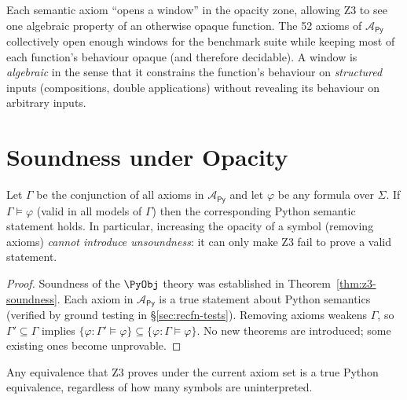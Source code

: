 \begin{remark}
\label{rem:axiom-windows}
Each semantic axiom ``opens a window'' in the opacity zone, allowing
Z3 to see one algebraic property of an otherwise opaque function.
The 52 axioms of $\mathcal{A}_{\mathsf{Py}}$ collectively open
enough windows for the benchmark suite while keeping most of each
function's behaviour opaque (and therefore decidable).
A window is \emph{algebraic} in the sense that it constrains the
function's behaviour on \emph{structured} inputs (compositions,
double applications) without revealing its behaviour on arbitrary
inputs.
\end{remark}


\section{Soundness under Opacity}
\label{sec:opacity-soundness}

\begin{theorem}
\label{thm:opacity-soundness}
Let $\Gamma$ be the conjunction of all axioms in
$\mathcal{A}_{\mathsf{Py}}$ and let $\varphi$ be any formula over
$\Sigma$.  If $\Gamma \models \varphi$ (valid in all models of
$\Gamma$) then the corresponding Python semantic statement holds.
In particular, increasing the opacity of a symbol (removing axioms)
\emph{cannot introduce unsoundness}: it can only make Z3 fail to
prove a valid statement.
\end{theorem}

\begin{proof}
Soundness of the $\PyObj$ theory was established in
Theorem~\ref{thm:z3-soundness}.  Each axiom in
$\mathcal{A}_{\mathsf{Py}}$ is a true statement about Python
semantics (verified by ground testing in \S\ref{sec:recfn-tests}).
Removing axioms weakens $\Gamma$, so
$\Gamma' \subseteq \Gamma$ implies
$\{\varphi : \Gamma' \models \varphi\}
  \subseteq
\{\varphi : \Gamma \models \varphi\}$.
No new theorems are introduced; some existing ones become
unprovable.
\end{proof}

\begin{corollary}
Any equivalence that Z3 proves under the current axiom set is a
true Python equivalence, regardless of how many symbols are
uninterpreted.
\end{corollary}


